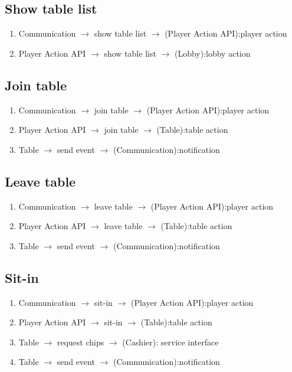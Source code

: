\documentclass[a4paper,11pt]{report}
\begin{document}
\subsection{Show table list}
\begin{enumerate}
\item Communication $\rightarrow$ show table list $\rightarrow$ (Player Action API):player action
\item Player Action API $\rightarrow$ show table list $\rightarrow$ (Lobby):lobby action
\end{enumerate}

\subsection{Join table}
\begin{enumerate}
\item Communication $\rightarrow$ join table $\rightarrow$ (Player Action API):player action
\item Player Action API $\rightarrow$ join table $\rightarrow$ (Table):table action
\item Table $\rightarrow$ send event $\rightarrow$ (Communication):notification
\end{enumerate}

\subsection{Leave table}
\begin{enumerate}
\item Communication $\rightarrow$ leave table $\rightarrow$ (Player Action API):player action
\item Player Action API $\rightarrow$ leave table $\rightarrow$ (Table):table action
\item Table $\rightarrow$ send event $\rightarrow$ (Communication):notification
\end{enumerate}

\subsection{Sit-in}
\begin{enumerate}
\item Communication $\rightarrow$ sit-in $\rightarrow$ (Player Action API):player action
\item Player Action API $\rightarrow$ sit-in $\rightarrow$ (Table):table action
\item Table $\rightarrow$ request chips $\rightarrow$ (Cashier): service interface
\item Table $\rightarrow$ send event $\rightarrow$ (Communication):notification
\end{enumerate}
\end{document}
